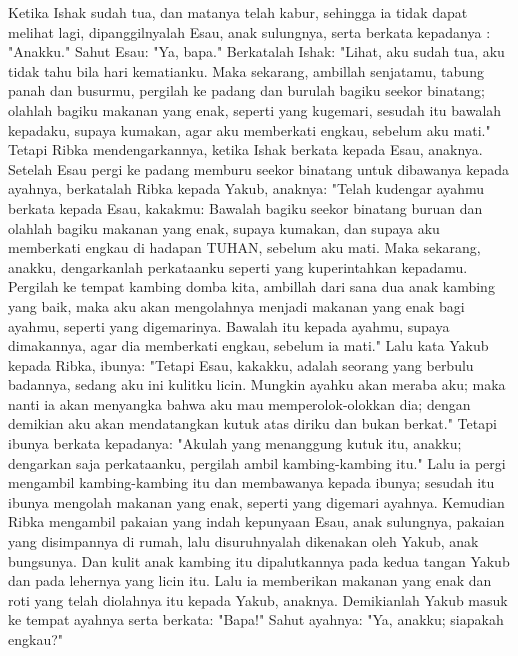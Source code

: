 \begin{biblechapter} %
 Ketika Ishak sudah tua, dan matanya telah kabur, sehingga ia tidak dapat melihat lagi, dipanggilnyalah Esau, anak sulungnya, serta berkata kepadanya : "Anakku." Sahut Esau: "Ya, bapa."
\verse Berkatalah Ishak: "Lihat, aku sudah tua, aku tidak tahu bila hari kematianku.
\verse Maka sekarang, ambillah senjatamu, tabung panah dan busurmu, pergilah ke padang dan burulah bagiku seekor binatang;
\verse olahlah bagiku makanan yang enak, seperti yang kugemari, sesudah itu bawalah kepadaku, supaya kumakan, agar aku memberkati engkau, sebelum aku mati."
\verse Tetapi Ribka mendengarkannya, ketika Ishak berkata kepada Esau, anaknya. Setelah Esau pergi ke padang memburu seekor binatang untuk dibawanya kepada ayahnya,
\verse berkatalah Ribka kepada Yakub, anaknya: "Telah kudengar ayahmu berkata kepada Esau, kakakmu:
\verse Bawalah bagiku seekor binatang buruan dan olahlah bagiku makanan yang enak, supaya kumakan, dan supaya aku memberkati engkau di hadapan TUHAN, sebelum aku mati.
\verse Maka sekarang, anakku, dengarkanlah perkataanku seperti yang kuperintahkan kepadamu.
\verse Pergilah ke tempat kambing domba kita, ambillah dari sana dua anak kambing yang baik, maka aku akan mengolahnya menjadi makanan yang enak bagi ayahmu, seperti yang digemarinya.
\verse Bawalah itu kepada ayahmu, supaya dimakannya, agar dia memberkati engkau, sebelum ia mati."
\verse Lalu kata Yakub kepada Ribka, ibunya: "Tetapi Esau, kakakku, adalah seorang yang berbulu badannya, sedang aku ini kulitku licin.
\verse Mungkin ayahku akan meraba aku; maka nanti ia akan menyangka bahwa aku mau memperolok-olokkan dia; dengan demikian aku akan mendatangkan kutuk atas diriku dan bukan berkat."
\verse Tetapi ibunya berkata kepadanya: "Akulah yang menanggung kutuk itu, anakku; dengarkan saja perkataanku, pergilah ambil kambing-kambing itu."
\verse Lalu ia pergi mengambil kambing-kambing itu dan membawanya kepada ibunya; sesudah itu ibunya mengolah makanan yang enak, seperti yang digemari ayahnya.
\verse Kemudian Ribka mengambil pakaian yang indah kepunyaan Esau, anak sulungnya, pakaian yang disimpannya di rumah, lalu disuruhnyalah dikenakan oleh Yakub, anak bungsunya.
\verse Dan kulit anak kambing itu dipalutkannya pada kedua tangan Yakub dan pada lehernya yang licin itu.
\verse Lalu ia memberikan makanan yang enak dan roti yang telah diolahnya itu kepada Yakub, anaknya.
\verse Demikianlah Yakub masuk ke tempat ayahnya serta berkata: "Bapa!" Sahut ayahnya: "Ya, anakku; siapakah engkau?"

\end{biblechapter}
